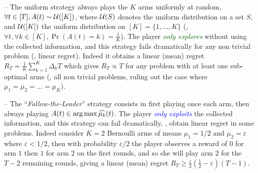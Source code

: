 -- The uniform strategy always plays the $K$ arms uniformly at random,
$\forall t\in[T], A(t) \sim \mathcal{U}([K])$, where $\mathcal{U}(S)$ denotes the uniform distribution on a set $S$, and $\mathcal{U}([K])$ the uniform distribution on $[K] = \{1,\dots,K\}$ (\ie, $\forall t, \forall k\in[K], \Pr(A(t) = k) = \frac{1}{K}$).
%
The player \textcolor{darkgreen}{\emph{only explores}} without using the collected information, and this strategy fails dramatically for any non trivial problem (\ie, linear regret).
Indeed it obtains a linear (mean) regret $R_T = \frac{1}{K} \sum_{k=1}^K \Delta_k T$
which gives $R_T \propto T$ for any problem with at least one sub-optimal arms (\ie, all non trivial problems, ruling out the case where $\mu_1=\mu_2=\dots=\mu_K$).

-- The ``\emph{Follow-the-Leader}'' strategy consists in first playing once each arm, then always playing $A(t)\in\operatorname*{arg\,max} \widehat{\mu_k}(t)$.
The player \textcolor{blue}{\emph{only exploits}} the collected information, and this strategy can fail dramatically, \ie, obtain linear regret in some problems.
Indeed consider $K=2$ Bernoulli arms of means $\mu_1=1/2$ and $\mu_2=\varepsilon$ where $\varepsilon < 1/2$, then with probability $\varepsilon/2$ the player observes a reward of $0$ for arm $1$ then $1$ for arm $2$ on the first rounds, and so she will play arm $2$ for the $T-2$ remaining rounds, giving a linear (mean) regret $R_T \geq \frac{\varepsilon}{2}\left(\frac{1}{2} - \varepsilon\right) (T-1)$.



